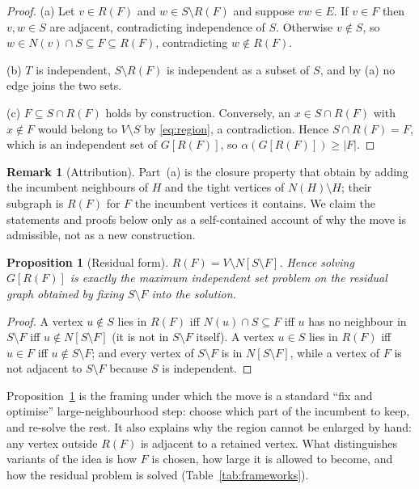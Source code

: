\documentclass[review,authoryear,11pt]{elsarticle}
\newtheorem{proposition}[theorem]{Proposition}
\theoremstyle{definition}
\newtheorem{remark}[theorem]{Remark}
\begin{document}
\begin{proof}
(a) Let $v \in R(F)$ and $w \in S \setminus R(F)$ and suppose $vw \in E$. If
$v \in F$ then $v,w \in S$ are adjacent, contradicting independence of $S$.
Otherwise $v \notin S$, so $w \in N(v) \cap S \subseteq F \subseteq R(F)$,
contradicting $w \notin R(F)$.

(b) $T$ is independent, $S \setminus R(F)$ is independent as a subset of $S$,
and by (a) no edge joins the two sets.

(c) $F \subseteq S \cap R(F)$ holds by construction. Conversely, an
$x \in S \cap R(F)$ with $x \notin F$ would belong to $V \setminus S$ by
\eqref{eq:region}, a contradiction. Hence $S \cap R(F) = F$, which is an
independent set of $G[R(F)]$, so $\alpha(G[R(F)]) \ge |F|$.
\end{proof}

\begin{remark}[Attribution]
\label{rem:attr}
Part~(a) is the closure property that \citet{borowitz2025} obtain by adding the
incumbent neighbours of $H$ and the tight vertices of $N(H)\setminus H$; their
subgraph is $R(F)$ for $F$ the incumbent vertices it contains. We claim
the statements and proofs below only as a self-contained account of why the move
is admissible, not as a new construction.
\end{remark}

\begin{proposition}[Residual form]
\label{prop:residual}
$R(F) = V \setminus N[S \setminus F]$. Hence solving $G[R(F)]$ is exactly the
maximum independent set problem on the residual graph obtained by fixing
$S \setminus F$ into the solution.
\end{proposition}

\begin{proof}
A vertex $u \notin S$ lies in $R(F)$ iff $N(u)\cap S\subseteq F$ iff $u$ has no
neighbour in $S\setminus F$ iff $u \notin N[S\setminus F]$ (it is not in
$S \setminus F$ itself). A vertex $u\in S$ lies in $R(F)$ iff $u\in F$ iff
$u\notin S\setminus F$; and every vertex of $S \setminus F$ is in
$N[S\setminus F]$, while a vertex of $F$ is not adjacent to $S\setminus F$
because $S$ is independent.
\end{proof}

Proposition~\ref{prop:residual} is the framing under which the move is a
standard ``fix and optimise'' large-neighbourhood step: choose which part of the
incumbent to keep, and re-solve the rest. It also explains why the region cannot
be enlarged by hand: any vertex outside $R(F)$ is adjacent to a retained
vertex. What distinguishes variants of the idea is how $F$ is chosen, how large
it is allowed to become, and how the residual problem is solved
(Table~\ref{tab:frameworks}).
\end{document}
